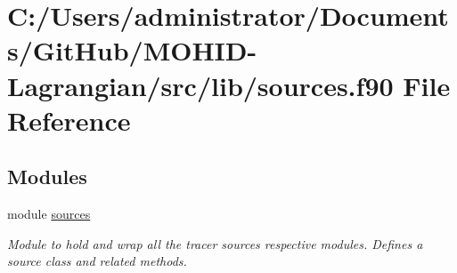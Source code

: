 \hypertarget{sources_8f90}{}\section{C\+:/\+Users/administrator/\+Documents/\+Git\+Hub/\+M\+O\+H\+I\+D-\/\+Lagrangian/src/lib/sources.f90 File Reference}
\label{sources_8f90}
\subsection*{Modules}
\begin{DoxyCompactItemize}
\item 
module \mbox{\hyperlink{namespacesources}{sources}}
\begin{DoxyCompactList}\small\item\em Module to hold and wrap all the tracer sources respective modules. Defines a source class and related methods. \end{DoxyCompactList}\end{DoxyCompactItemize}
